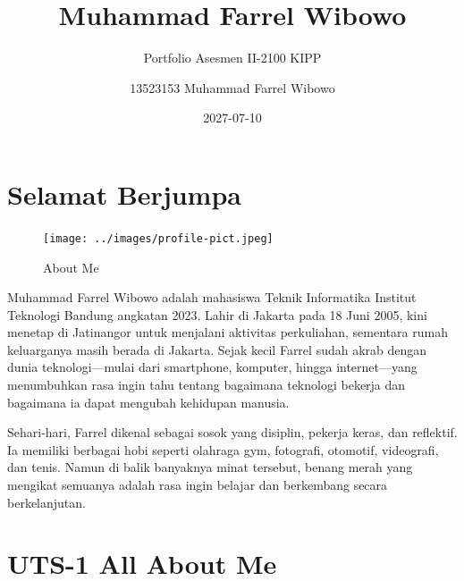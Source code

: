 \documentclass[
  letterpaper,
  DIV=11,
  numbers=noendperiod]{scrreprt}
\title{Muhammad Farrel Wibowo}
\subtitle{Portfolio Asesmen II-2100 KIPP}
\author{13523153 Muhammad Farrel Wibowo}
\date{2027-07-10}
\renewcommand*\contentsname{Table of contents}
\newcommand\contentsname{Table of contents}
\begin{document}
\maketitle

\renewcommand*\contentsname{Table of contents}
{
\hypersetup{linkcolor=}
\setcounter{tocdepth}{2}
\tableofcontents
}


\chapter*{Selamat Berjumpa}\label{selamat-berjumpa}


\begin{figure}[H]

{\centering \texttt{[image: ../images/profile-pict.jpeg]}

}

\caption{About Me}

\end{figure}%

Muhammad Farrel Wibowo adalah mahasiswa Teknik Informatika Institut
Teknologi Bandung angkatan 2023. Lahir di Jakarta pada 18 Juni 2005,
kini menetap di Jatinangor untuk menjalani aktivitas perkuliahan,
sementara rumah keluarganya masih berada di Jakarta. Sejak kecil Farrel
sudah akrab dengan dunia teknologi---mulai dari smartphone, komputer,
hingga internet---yang menumbuhkan rasa ingin tahu tentang bagaimana
teknologi bekerja dan bagaimana ia dapat mengubah kehidupan manusia.

Sehari-hari, Farrel dikenal sebagai sosok yang disiplin, pekerja keras,
dan reflektif. Ia memiliki berbagai hobi seperti olahraga gym,
fotografi, otomotif, videografi, dan tenis. Namun di balik banyaknya
minat tersebut, benang merah yang mengikat semuanya adalah rasa ingin
belajar dan berkembang secara berkelanjutan.


\chapter{UTS-1 All About Me}\label{uts-1-all-about-me}
\end{document}
